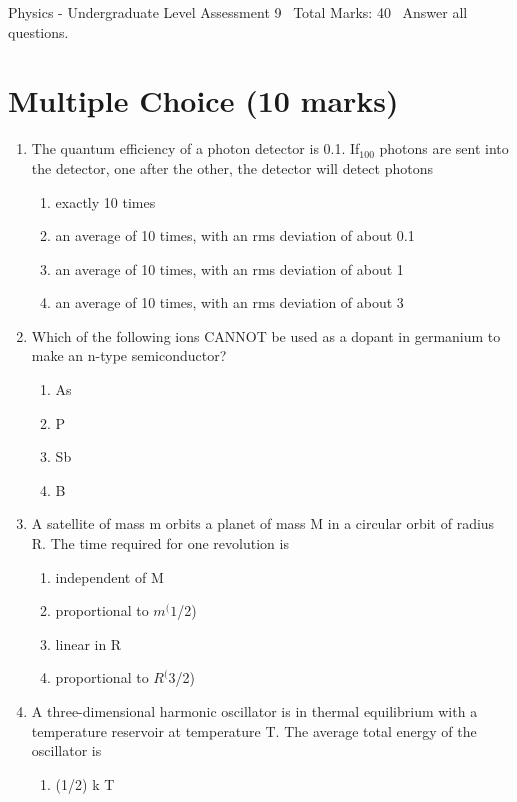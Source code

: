 \documentclass[12pt]{article}
\begin{document}
\begin{center}
Physics - Undergraduate Level Assessment 9 \
Total Marks: 40 \
Answer all questions.
\end{center}

\section*{Multiple Choice (10 marks)}
\begin{enumerate}[label=\arabic*.]
\item The quantum efficiency of a photon detector is 0.1. If$_{100}$ photons are sent into the detector, one after the other, the detector will detect photons
\begin{enumerate}[label=(\alph*)]
    \item exactly 10 times
    \item an average of 10 times, with an rms deviation of about 0.1
    \item an average of 10 times, with an rms deviation of about 1
    \item an average of 10 times, with an rms deviation of about 3
\end{enumerate}
\item Which of the following ions CANNOT be used as a dopant in germanium to make an n-type semiconductor?
\begin{enumerate}[label=(\alph*)]
    \item As
    \item P
    \item Sb
    \item B
\end{enumerate}
\item A satellite of mass m orbits a planet of mass M in a circular orbit of radius R. The time required for one revolution is
\begin{enumerate}[label=(\alph*)]
    \item independent of M
    \item proportional to $m^(1$/2)
    \item linear in R
    \item proportional to $R^(3$/2)
\end{enumerate}
\item A three-dimensional harmonic oscillator is in thermal equilibrium with a temperature reservoir at temperature T. The average total energy of the oscillator is
\begin{enumerate}[label=(\alph*)]
    \item (1/2) k T

\end{enumerate}
\end{enumerate}
\end{document}
